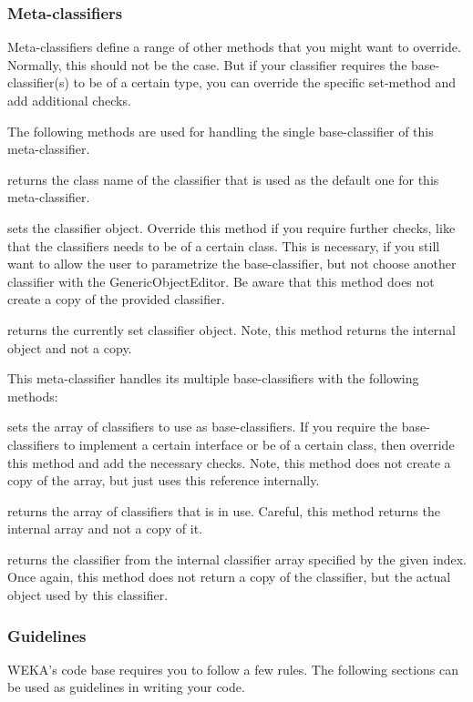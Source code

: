 \newpage
\subsubsection*{Meta-classifiers}
Meta-classifiers define a range of other methods that you might want to
override. Normally, this should not be the case. But if your classifier requires
the base-classifier(s) to be of a certain type, you can override the specific
set-method and add additional checks.

The following methods are used for handling the single base-classifier of this
meta-classifier.

returns the class name of the classifier that is used as the default one for
this meta-classifier.

sets the classifier object. Override this method if you require further checks,
like that the classifiers needs to be of a certain class. This is necessary, if
you still want to allow the user to parametrize the base-classifier, but not
choose another classifier with the GenericObjectEditor. Be aware that this
method does not create a copy of the provided classifier.

returns the currently set classifier object. Note, this method returns the
internal object and not a copy.

This meta-classifier handles its multiple base-classifiers with the following
methods:

sets the array of classifiers to use as base-classifiers. If you require the
base-classifiers to implement a certain interface or be of a certain class, then
override this method and add the necessary checks. Note, this method does not
create a copy of the array, but just uses this reference internally.

returns the array of classifiers that is in use. Careful, this method returns
the internal array and not a copy of it.

returns the classifier from the internal classifier array specified by the given
index. Once again, this method does not return a copy of the classifier, but the
actual object used by this classifier.

\newpage
\subsubsection{Guidelines}
WEKA's code base requires you to follow a few rules. The following sections can
be used as guidelines in writing your code.


